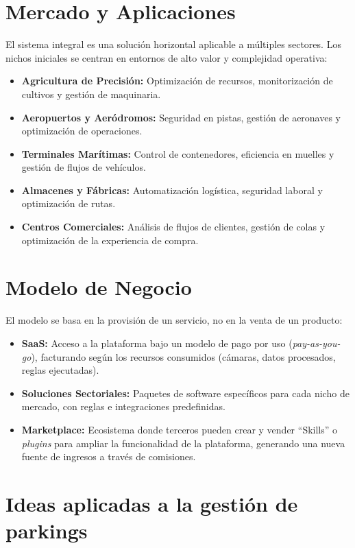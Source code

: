 \documentclass[12pt,a4paper]{article}
\begin{document}
	\section{Mercado y Aplicaciones}
	
	El sistema integral es una solución horizontal aplicable a múltiples sectores. 
	Los nichos iniciales se centran en entornos de alto valor y complejidad operativa:
	
	\begin{itemize}
		\item \textbf{Agricultura de Precisión:} Optimización de recursos, monitorización de cultivos y gestión de maquinaria.
		\item \textbf{Aeropuertos y Aeródromos:} Seguridad en pistas, gestión de aeronaves y optimización de operaciones.
		\item \textbf{Terminales Marítimas:} Control de contenedores, eficiencia en muelles y gestión de flujos de vehículos.
		\item \textbf{Almacenes y Fábricas:} Automatización logística, seguridad laboral y optimización de rutas.
		\item \textbf{Centros Comerciales:} Análisis de flujos de clientes, gestión de colas y optimización de la experiencia de compra.
	\end{itemize}
	
	\section{Modelo de Negocio}
	
	El modelo se basa en la provisión de un servicio, no en la venta de un producto:
	
	\begin{itemize}
		\item \textbf{SaaS:} Acceso a la plataforma bajo un modelo de pago por uso (\textit{pay-as-you-go}), 
		facturando según los recursos consumidos (cámaras, datos procesados, reglas ejecutadas).
		\item \textbf{Soluciones Sectoriales:} Paquetes de software específicos para cada nicho de mercado, 
		con reglas e integraciones predefinidas.
		\item \textbf{Marketplace:} Ecosistema donde terceros pueden crear y vender “Skills” o \textit{plugins} 
		para ampliar la funcionalidad de la plataforma, generando una nueva fuente de ingresos a través de comisiones.
	\end{itemize}
	
	\section{Ideas aplicadas a la gestión de parkings}
	
\end{document}

